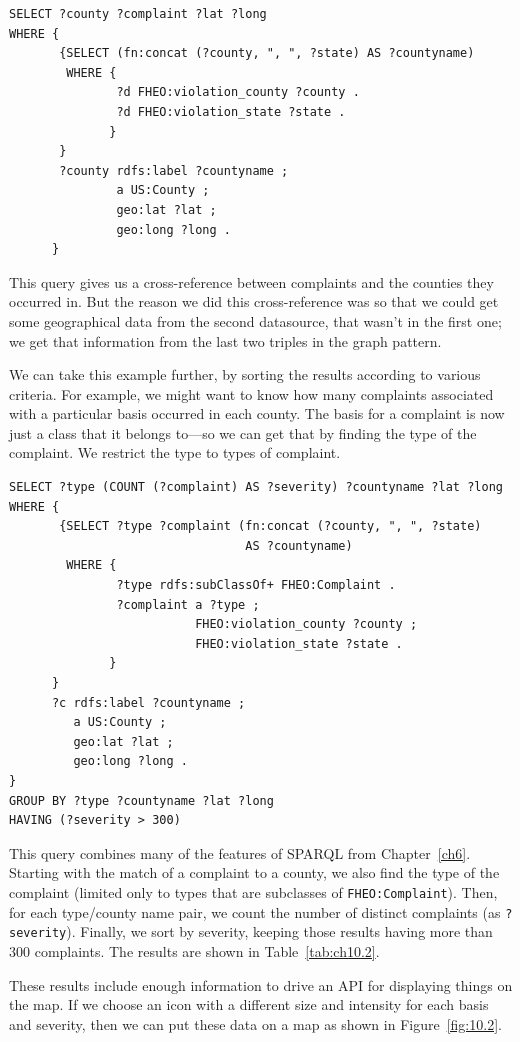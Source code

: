 \begin{lstlisting}
SELECT ?county ?complaint ?lat ?long
WHERE {
       {SELECT (fn:concat (?county, ", ", ?state) AS ?countyname)
        WHERE {
               ?d FHEO:violation_county ?county .
               ?d FHEO:violation_state ?state .
              }
       }
       ?county rdfs:label ?countyname ;
               a US:County ;
               geo:lat ?lat ;
               geo:long ?long .
      }
\end{lstlisting}

This query gives us a cross-reference between complaints and the
counties they occurred in. But the reason we did this cross-reference
was so that we could get some geographical data from the second
datasource, that wasn't in the first one; we get that information from
the last two triples in the graph pattern.

We can take this example further, by sorting the results according to
various criteria. For example, we might want to know how many complaints
associated with a particular basis occurred in each county. The basis
for a complaint is now just a class that it belongs to---so we can get
that by finding the type of the complaint. We restrict the type to types
of complaint.

\begin{lstlisting}
SELECT ?type (COUNT (?complaint) AS ?severity) ?countyname ?lat ?long
WHERE {
       {SELECT ?type ?complaint (fn:concat (?county, ", ", ?state)
                                 AS ?countyname)
        WHERE {
               ?type rdfs:subClassOf+ FHEO:Complaint .
               ?complaint a ?type ;
                          FHEO:violation_county ?county ;
                          FHEO:violation_state ?state .
              }
      }
      ?c rdfs:label ?countyname ;
         a US:County ;
         geo:lat ?lat ;
         geo:long ?long .
}
GROUP BY ?type ?countyname ?lat ?long
HAVING (?severity > 300)
\end{lstlisting}

This query combines many of the features of SPARQL from Chapter~\ref{ch6}.
Starting with the match of a complaint to a county, we also find the
type of the complaint (limited only to types that are subclasses of
\texttt{FHEO:Complaint}). Then, for each type/county name pair, we count the
number of distinct complaints (as \texttt{?severity}). Finally, we sort by
severity, keeping those results having more than 300 complaints. The
results are shown in Table~\ref{tab:ch10.2}.

These results include enough information to drive an API for displaying
things on the map. If we choose an icon with a different size and
intensity for each basis and severity, then we can put these data on a
map as shown in Figure~\ref{fig:10.2}.

